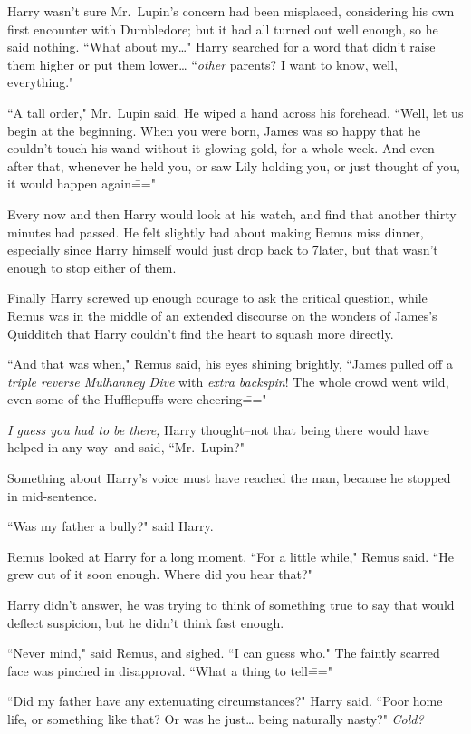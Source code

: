 Harry wasn't sure Mr.~Lupin's concern had been misplaced, considering his own first encounter with Dumbledore; but it had all turned out well enough, so he said nothing. ``What about my{\ldots}" Harry searched for a word that didn't raise them higher or put them lower{\ldots} ``\emph{other} parents? I want to know, well, everything."

``A tall order," Mr.~Lupin said. He wiped a hand across his forehead. ``Well, let us begin at the beginning. When you were born, James was so happy that he couldn't touch his wand without it glowing gold, for a whole week. And even after that, whenever he held you, or saw Lily holding you, or just thought of you, it would happen again\==="

\later

Every now and then Harry would look at his watch, and find that another thirty minutes had passed. He felt slightly bad about making Remus miss dinner, especially since Harry himself would just drop back to 7\pm later, but that wasn't enough to stop either of them.

Finally Harry screwed up enough courage to ask the critical question, while Remus was in the middle of an extended discourse on the wonders of James's Quidditch that Harry couldn't find the heart to squash more directly.

``And that was when," Remus said, his eyes shining brightly, ``James pulled off a \emph{triple reverse Mulhanney Dive} with \emph{extra backspin}! The whole crowd went wild, even some of the Hufflepuffs were cheering\==="

\emph{I guess you had to be there,} Harry thought\---not that being there would have helped in any way\---and said, ``Mr.~Lupin?"

Something about Harry's voice must have reached the man, because he stopped in mid-sentence.

``Was my father a bully?" said Harry.

Remus looked at Harry for a long moment. ``For a little while," Remus said. ``He grew out of it soon enough. Where did you hear that?"

Harry didn't answer, he was trying to think of something true to say that would deflect suspicion, but he didn't think fast enough.

``Never mind," said Remus, and sighed. ``I can guess who." The faintly scarred face was pinched in disapproval. ``What a thing to tell\==="

``Did my father have any extenuating circumstances?" Harry said. ``Poor home life, or something like that? Or was he just{\ldots} being naturally nasty?" \emph{Cold?}

